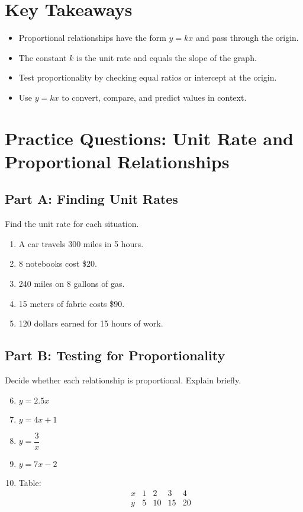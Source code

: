 \documentclass[12pt]{article}
\begin{document}
\section*{Key Takeaways}
\begin{itemize}
  \item Proportional relationships have the form \(y = kx\) and pass through the origin.
  \item The constant \(k\) is the unit rate and equals the slope of the graph.
  \item Test proportionality by checking equal ratios or intercept at the origin.
  \item Use \(y = kx\) to convert, compare, and predict values in context.
\end{itemize}

\newpage


\section*{Practice Questions: Unit Rate and Proportional Relationships}

\subsection*{Part A: Finding Unit Rates}
Find the unit rate for each situation.
\begin{enumerate}
  \item A car travels 300 miles in 5 hours.
  \item 8 notebooks cost \$20.
  \item 240 miles on 8 gallons of gas.
  \item 15 meters of fabric costs \$90.
  \item 120 dollars earned for 15 hours of work.
\end{enumerate}

\subsection*{Part B: Testing for Proportionality}
Decide whether each relationship is proportional. Explain briefly.
\begin{enumerate}
  \setcounter{enumi}{5}
  \item \(y = 2.5x\)
  \item \(y = 4x + 1\)
  \item \(y = \dfrac{3}{x}\)
  \item \(y = 7x - 2\)
  \item Table:  
  \[
  \begin{array}{c|cccc}
  x & 1 & 2 & 3 & 4\\ \hline
  y & 5 & 10 & 15 & 20
  \end{array}
  \]
\end{enumerate}
\end{document}
